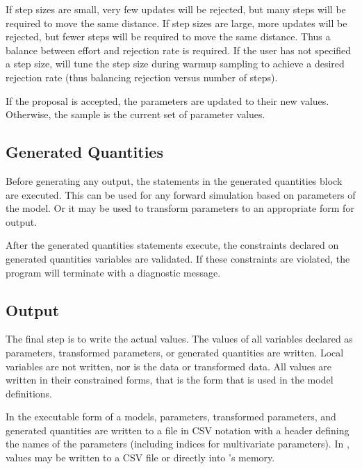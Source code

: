 \documentclass[article]{jss}
\begin{document}
If step sizes are small, very few updates will be rejected, but many
steps will be required to move the same distance.  If step sizes are
large, more updates will be rejected, but fewer steps will be required
to move the same distance.  Thus a balance between effort and
rejection rate is required.  If the user has not specified a step
size,  will tune the step size during warmup sampling to achieve
a desired rejection rate (thus balancing rejection versus number of
steps).

If the proposal is accepted, the parameters are updated to their new
values.  Otherwise, the sample is the current set of parameter values.


\subsection{Generated Quantities} 

Before generating any output, the statements in the generated quantities 
block are executed.  This can be used for any forward simulation based
on parameters of the model.  Or it may be used to transform parameters
to an appropriate form for output.  

After the generated quantities statements execute, the constraints
declared on generated quantities variables are validated.   If these
constraints are violated, the program will terminate with a diagnostic message.

\subsection{Output}

The final step is to write the actual values.  The values of all
variables declared as parameters, transformed parameters, or generated
quantities are written.  Local variables are not written, nor is the
data or transformed data.  All values are written in their constrained
forms, that is the form that is used in the model definitions.

In the executable form of a  models, parameters,
transformed parameters, and generated quantities are written to a file
in CSV notation with a header defining the names of the parameters
(including indices for multivariate parameters).  In ,
values may be written to a CSV file or directly into 's
memory.







%

\end{document}
